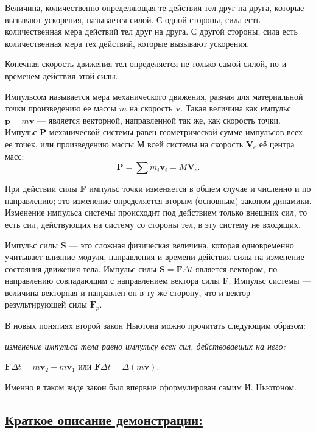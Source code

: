 \documentclass[14pt,a4paper,oneside]{extarticle}	%
\begin{document}
Величина, количественно определяющая те действия тел друг 
на друга, которые вызывают ускорения, называется силой. 
С одной стороны, сила есть количественная мера действий тел друг на друга.
С другой стороны, сила есть количественная мера тех действий, которые вызывают ускорения.  

Конечная скорость движения тел определяется не только самой 
силой, но и временем действия этой силы. 

Импульсом называется мера механического движения, равная для материальной точки произведению ее массы $ m $ на скорость $ \textbf{v} $.
Такая величина как импульс $ \textbf{p} = m\textbf{v} $ — является векторной, направленной так же, как скорость точки.
Импульс $ \textbf{P} $ механической системы равен геометрической сумме импульсов всех ее точек, или произведению массы $ М $ всей системы на скорость $ \textbf{V}_{c} $ её центра масс: $$ \textbf{P} = \sum m_{i} \textbf{v}_{i} =  M\textbf{V}_{c}. $$

При действии силы \textbf{F} импульс точки изменяется в общем случае и численно и по направлению; это изменение определяется вторым (основным) законом динамики.
Изменение импульса системы происходит под действием только внешних сил, то есть сил, действующих на систему со стороны тел, в эту систему не входящих.

Импульс силы \textbf{S} — это сложная физическая величина, которая 
одновременно учитывает влияние модуля, направления и времени 
действия силы на изменение состояния движения тела.
Импульс силы $\textbf{S} = \textbf{F}\Delta t $ является вектором, по направлению совпадающим с направлением вектора силы \textbf{F}. 
Импульс системы — величина векторная и направлен он в ту же сторону, что и вектор результирующей силы $ \textbf{F}_{p} $.

В новых понятиях второй закон Ньютона можно прочитать следующим образом: 
\begin{flushleft}
	\textit{изменение импульса тела равно импульсу всех сил, действовавших на него:}
\end{flushleft}

\begin{center}
		$\textbf{F}\Delta t = m\textbf{v}_{2} - m\textbf{v}_{1} $ или $\textbf{F}\Delta t = \Delta(m\textbf{v}). $
\end{center}

Именно в таком виде закон был впервые сформулирован самим И. Ньютоном.

\newpage
\subsection*{\underline{Краткое описание демонстрации:}}
\end{document}
